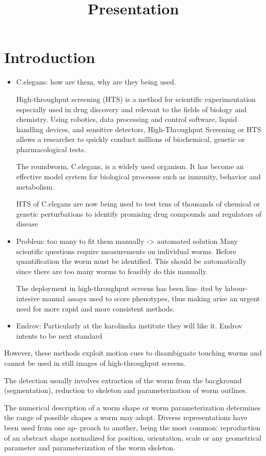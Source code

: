\documentclass[12pt,letterpaper,oneside]{book}
\title{Presentation}
\begin{document}
\section*{Introduction}

\begin{itemize}
\item C.elegans: how are them, why are they being used.

High-throughput screening (HTS) is a method for scientific experimentation especially
 used in drug discovery and relevant to the fields of biology and chemistry. Using robotics,
 data processing and control software, liquid handling devices, and sensitive detectors, 
High-Throughput
 Screening or HTS allows a researcher to quickly conduct millions of biochemical, genetic or
 pharmacological tests. 

The roundworm, C.elegans, is a widely used organism. It has become
an effective model system for biological processes such as 
inmunity, behavior and metabolism.

HTS of C.elegans are now being used to test tens of thousands of chemical or genetic
perturbations to identify promising drug compounds and regulators
of disease

\item Problem: too many to fit them manually -> automated solution
Many scientific questions
require measurements on individual worms. Before quantification the
worm must be identified. This should be automatically since there are too many
worms to feasibly do this manually.

The deployment in high-throughput screens has been lim-
ited by labour-intesive manual assays used to score phenotypes, thus making arise an urgent
need for more rapid and more consistent methods.


\item Endrov: Particularly at the karolinska institute they will
  like it. Endrov intents to be next standard
\end{itemize}



However, these methods exploit motion
cues to disambiguate touching worms and cannot be used
in still images of high-throughput screens.

The detection usually involves extraction of
the worm from the bacgkround (segmentation), reduction to skeleton and parameterization
of worm outlines.

 The numerical description of a worm shape or worm parameterization determines the range
of possible shapes a worm may adopt. Diverse representations have been used from one ap-
proach to another, being the most common: reproduction of an abstract shape normalized
for position, orientation, scale or any geometrical parameter and parameterization of the
worm skeleton.
\end{document}
